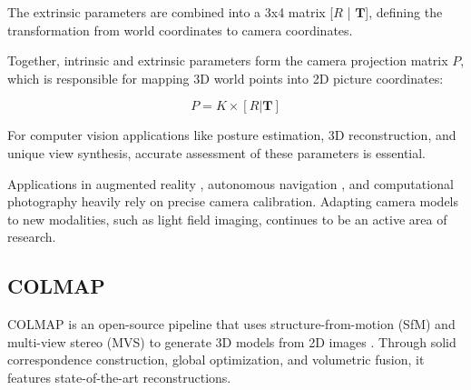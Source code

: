 The extrinsic parameters are combined into a 3x4 matrix [$R$ | $\mathbf{T}$], defining the transformation from world coordinates to camera coordinates.

\vspace{10pt}

Together, intrinsic and extrinsic parameters form the camera projection matrix $P$, which is responsible for mapping 3D world points into 2D picture coordinates:

\begin{equation}
P = K \times [R | \mathbf{T}]
\end{equation}

For computer vision applications like posture estimation, 3D reconstruction, and unique view synthesis, accurate assessment of these parameters is essential.


\vspace{10pt}

Applications in augmented reality \cite{Zhang1995}, autonomous navigation \cite{Zhang1995}, and computational photography \cite{Zhang1995} heavily rely on precise camera calibration. Adapting camera models to new modalities, such as light field imaging, continues to be an active area of research.


\subsection{COLMAP}

COLMAP is an open-source pipeline that uses structure-from-motion (SfM) and multi-view stereo (MVS) to generate 3D models from 2D images \cite{Schönberger}. Through solid correspondence construction, global optimization, and volumetric fusion, it features state-of-the-art reconstructions.

